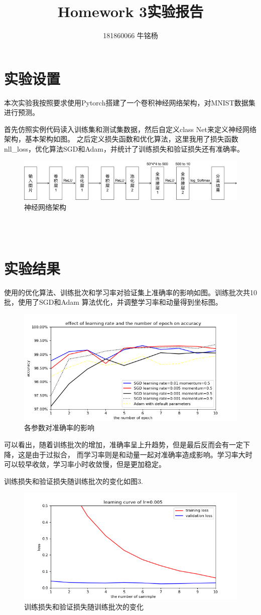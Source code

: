 \documentclass{article}
\title{Homework 3实验报告}
\author{181860066 牛铭杨}
\begin{document}
\maketitle
{}
\section{实验设置}
    本次实验我按照要求使用Pytorch搭建了一个卷积神经网络架构，对MNIST数据集进行预测。

    首先仿照实例代码读入训练集和测试集数据，然后自定义class Net来定义神经网络架构，基本架构如图。
    之后定义损失函数和优化算法，这里我用了损失函数nll\_loss，优化算法SGD和Adam，并统计了训练损失和验证损失还有准确率。
    \begin{figure}
        \centering
        \includegraphics[width=.7\textwidth]{network_architecture.png}
        \caption{神经网络架构}
    \end{figure}
    \\\\
\section{实验结果}
    使用的优化算法、训练批次和学习率对验证集上准确率的影响如图。训练批次共10批，使用了SGD和Adam
    算法优化，并调整学习率和动量得到坐标图。

    \begin{figure}
        \centering
        \includegraphics[width=.7\textwidth]{learning rate effect.png}
        \caption{各参数对准确率的影响}
    \end{figure}

    可以看出，随着训练批次的增加，准确率呈上升趋势，但是最后反而会有一定下降，这是由于过拟合，
    而学习率则是和动量一起对准确率造成影响。学习率大时可以较早收敛，学习率小时收敛慢，但是更加稳定。

    训练损失和验证损失随训练批次的变化如图3.
    \begin{figure}
        \centering
        \includegraphics[width=.7\textwidth]{learni curve.png}
        \caption{训练损失和验证损失随训练批次的变化}
    \end{figure}
    
\end{document}
